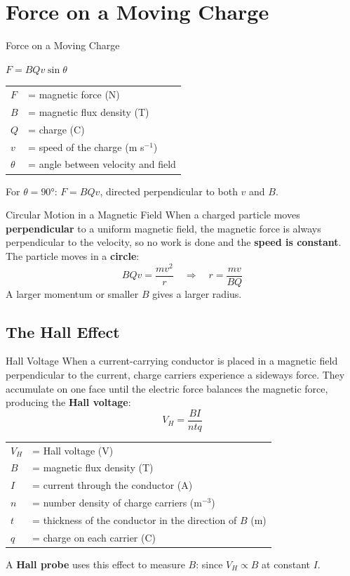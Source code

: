 \section{Force on a Moving Charge}

\begin{formulabox}{Force on a Moving Charge}
\begin{center}
\Large $F = BQv\sin\theta$
\end{center}
\vspace{0.3em}
\begin{tabular}{@{}ll@{}}
$F$ & = magnetic force (N) \\
$B$ & = magnetic flux density (T) \\
$Q$ & = charge (C) \\
$v$ & = speed of the charge (m s$^{-1}$) \\
$\theta$ & = angle between velocity and field \\
\end{tabular}
\vspace{0.4em}

For $\theta = 90°$: $F = BQv$, directed perpendicular to both $v$ and $B$.
\end{formulabox}

\begin{keybox}{Circular Motion in a Magnetic Field}
When a charged particle moves \textbf{perpendicular} to a uniform magnetic field, the magnetic force is always perpendicular to the velocity, so no work is done and the \textbf{speed is constant}. The particle moves in a \textbf{circle}:
$$BQv = \frac{mv^2}{r} \quad \Rightarrow \quad r = \frac{mv}{BQ}$$
A larger momentum or smaller $B$ gives a larger radius.
\end{keybox}

\subsection{The Hall Effect}

\begin{definitionbox}{Hall Voltage}
When a current-carrying conductor is placed in a magnetic field perpendicular to the current, charge carriers experience a sideways force. They accumulate on one face until the electric force balances the magnetic force, producing the \textbf{Hall voltage}:
$$V_H = \frac{BI}{ntq}$$
\begin{tabular}{@{}ll@{}}
$V_H$ & = Hall voltage (V) \\
$B$ & = magnetic flux density (T) \\
$I$ & = current through the conductor (A) \\
$n$ & = number density of charge carriers (m$^{-3}$) \\
$t$ & = thickness of the conductor in the direction of $B$ (m) \\
$q$ & = charge on each carrier (C) \\
\end{tabular}
\vspace{0.3em}

A \textbf{Hall probe} uses this effect to measure $B$: since $V_H \propto B$ at constant $I$.
\end{definitionbox}

